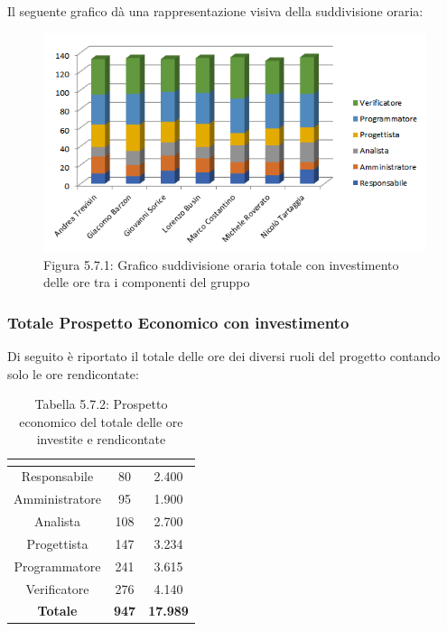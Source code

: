 Il seguente grafico dà una rappresentazione visiva della suddivisione oraria: \\
\begin{figure} [H]
	\centering
	\includegraphics[scale=1]{Res/ExcelGrafici/Grafici/InvestimentoOre.png}
	\caption{Figura 5.7.1: Grafico suddivisione oraria totale con investimento delle ore tra i componenti del gruppo}\label{}
\end{figure}

\subsubsection{Totale Prospetto Economico con investimento}
Di seguito è riportato il totale delle ore dei diversi ruoli del progetto contando solo le ore rendicontate:

\renewcommand{\arraystretch}{1.5}
\begin{table}[H]
\begin{center}
\begin{tabular}{|c|c|c|}
\hline
\rowcolor{title_row}
\textbf{\color{title_text}{Ruolo}}  & \textbf{\color{title_text}{Ore}} & \textbf{\color{title_text}{Costo in \euro}} \\ \hline
Responsabile    & 80 & 2.400 \\ \hline
Amministratore  & 95 & 1.900 \\ \hline
Analista        & 108 & 2.700 \\ \hline
Progettista     & 147 & 3.234 \\ \hline
Programmatore   & 241 & 3.615 \\ \hline
Verificatore    & 276 & 4.140 \\ \hline
\textbf{Totale} & \textbf{947}    & \textbf{17.989}           \\ \hline
\end{tabular}
\caption{Tabella 5.7.2: Prospetto economico del totale delle ore investite e rendicontate \label{}}
\end{center}
\end{table}
\renewcommand{\arraystretch}{1}

